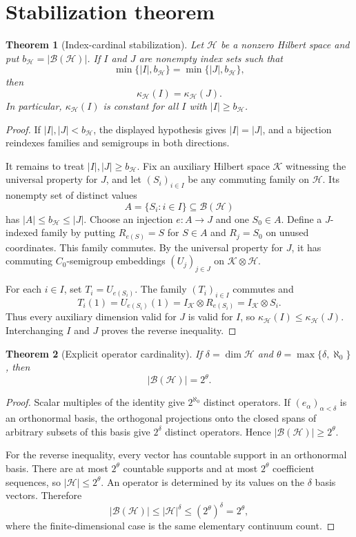 \documentclass[11pt]{article}
\newtheorem{theorem}{Theorem}
\newcommand{\B}{\mathcal B}
\newcommand{\kHI}{\kappa_{\mathcal H}}
\begin{document}
\section{Stabilization theorem}

\begin{theorem}[Index-cardinal stabilization]\label{thm:stabilization}
Let $\mathcal H$ be a nonzero Hilbert space and put
$b_{\mathcal H}=|\B(\mathcal H)|$. If $I$ and $J$ are nonempty index sets such that
\[
 \min\{|I|,b_{\mathcal H}\}=\min\{|J|,b_{\mathcal H}\},
\]
then
\[
 \kHI(I)=\kHI(J).
\]
In particular, $\kHI(I)$ is constant for all $I$ with $|I|\geq b_{\mathcal H}$.
\end{theorem}

\begin{proof}
If $|I|,|J|<b_{\mathcal H}$, the displayed hypothesis gives $|I|=|J|$, and a
bijection reindexes families and semigroups in both directions.

It remains to treat $|I|,|J|\geq b_{\mathcal H}$. Fix an auxiliary Hilbert space
$\mathcal K$ witnessing the universal property for $J$, and let
$(S_i)_{i\in I}$ be any commuting family on $\mathcal H$. Its nonempty set of distinct
values
\[
 A=\{S_i:i\in I\}\subseteq\B(\mathcal H)
\]
has $|A|\leq b_{\mathcal H}\leq|J|$. Choose an injection $e:A\to J$ and one
$S_0\in A$. Define a $J$-indexed family by putting $R_{e(S)}=S$ for $S\in A$ and
$R_j=S_0$ on unused coordinates. This family commutes. By the universal property for
$J$, it has commuting $C_0$-semigroup embeddings $(U_j)_{j\in J}$ on
$\mathcal K\otimes\mathcal H$.

For each $i\in I$, set $T_i=U_{e(S_i)}$. The family $(T_i)_{i\in I}$ commutes and
\[
 T_i(1)=U_{e(S_i)}(1)=I_{\mathcal K}\otimes R_{e(S_i)}
 =I_{\mathcal K}\otimes S_i.
\]
Thus every auxiliary dimension valid for $J$ is valid for $I$, so
$\kHI(I)\leq\kHI(J)$. Interchanging $I$ and $J$ proves the reverse inequality.
\end{proof}

\begin{theorem}[Explicit operator cardinality]\label{thm:cardinality}
If $\delta=\dim\mathcal H$ and $\theta=\max\{\delta,\aleph_0\}$, then
\[
 |\B(\mathcal H)|=2^\theta.
\]
\end{theorem}

\begin{proof}
Scalar multiples of the identity give $2^{\aleph_0}$ distinct operators. If
$(e_\alpha)_{\alpha<\delta}$ is an orthonormal basis, the orthogonal projections onto
the closed spans of arbitrary subsets of this basis give $2^\delta$ distinct operators.
Hence $|\B(\mathcal H)|\geq2^\theta$.

For the reverse inequality, every vector has countable support in an orthonormal basis.
There are at most $2^\theta$ countable supports and at most $2^\theta$ coefficient
sequences, so $|\mathcal H|\leq2^\theta$. An operator is determined by its values on
the $\delta$ basis vectors. Therefore
\[
 |\B(\mathcal H)|\leq|\mathcal H|^\delta
 \leq(2^\theta)^\delta=2^\theta,
\]
where the finite-dimensional case is the same elementary continuum count.
\end{proof}
\end{document}
